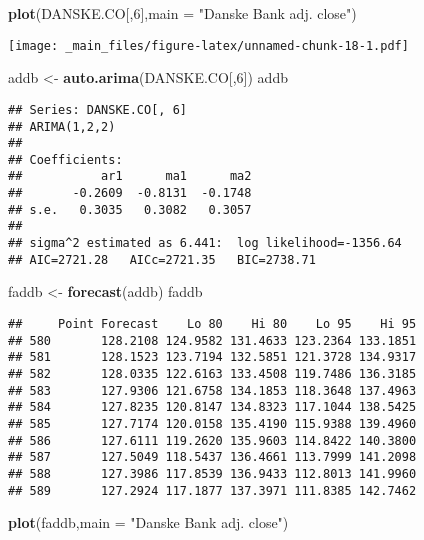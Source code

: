 \documentclass[]{book}
\newenvironment{Shaded}{\begin{snugshade}}{\end{snugshade}}
\newcommand{\DataTypeTok}[1]{\textcolor[rgb]{0.13,0.29,0.53}{#1}}
\newcommand{\DecValTok}[1]{\textcolor[rgb]{0.00,0.00,0.81}{#1}}
\newcommand{\KeywordTok}[1]{\textcolor[rgb]{0.13,0.29,0.53}{\textbf{#1}}}
\newcommand{\NormalTok}[1]{#1}
\newcommand{\StringTok}[1]{\textcolor[rgb]{0.31,0.60,0.02}{#1}}
\begin{document}
\begin{Shaded}
\begin{Highlighting}[]
\KeywordTok{plot}\NormalTok{(DANSKE.CO[,}\DecValTok{6}\NormalTok{],}\DataTypeTok{main =} \StringTok{"Danske Bank adj. close"}\NormalTok{)}
\end{Highlighting}
\end{Shaded}

\texttt{[image: \_main\_files/figure-latex/unnamed-chunk-18-1.pdf]}

\begin{Shaded}
\begin{Highlighting}[]
\NormalTok{addb <-}\StringTok{ }\KeywordTok{auto.arima}\NormalTok{(DANSKE.CO[,}\DecValTok{6}\NormalTok{])}
\NormalTok{addb}
\end{Highlighting}
\end{Shaded}

\begin{verbatim}
## Series: DANSKE.CO[, 6] 
## ARIMA(1,2,2) 
## 
## Coefficients:
##           ar1      ma1      ma2
##       -0.2609  -0.8131  -0.1748
## s.e.   0.3035   0.3082   0.3057
## 
## sigma^2 estimated as 6.441:  log likelihood=-1356.64
## AIC=2721.28   AICc=2721.35   BIC=2738.71
\end{verbatim}

\begin{Shaded}
\begin{Highlighting}[]
\NormalTok{faddb <-}\StringTok{ }\KeywordTok{forecast}\NormalTok{(addb)}
\NormalTok{faddb}
\end{Highlighting}
\end{Shaded}

\begin{verbatim}
##     Point Forecast    Lo 80    Hi 80    Lo 95    Hi 95
## 580       128.2108 124.9582 131.4633 123.2364 133.1851
## 581       128.1523 123.7194 132.5851 121.3728 134.9317
## 582       128.0335 122.6163 133.4508 119.7486 136.3185
## 583       127.9306 121.6758 134.1853 118.3648 137.4963
## 584       127.8235 120.8147 134.8323 117.1044 138.5425
## 585       127.7174 120.0158 135.4190 115.9388 139.4960
## 586       127.6111 119.2620 135.9603 114.8422 140.3800
## 587       127.5049 118.5437 136.4661 113.7999 141.2098
## 588       127.3986 117.8539 136.9433 112.8013 141.9960
## 589       127.2924 117.1877 137.3971 111.8385 142.7462
\end{verbatim}

\begin{Shaded}
\begin{Highlighting}[]
\KeywordTok{plot}\NormalTok{(faddb,}\DataTypeTok{main =} \StringTok{"Danske Bank adj. close"}\NormalTok{)}
\end{Highlighting}
\end{Shaded}
\end{document}
